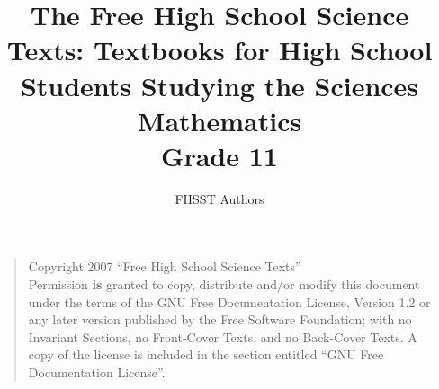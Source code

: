 \documentclass[10pt,a4paper,titlepage,twoside,openright]{report}
\begin{document}
\title{The Free High School Science Texts: Textbooks for High School Students Studying the Sciences\\
\textbf{Mathematics}\\
Grade 11}
\author{FHSST Authors}
\maketitle
\cleardoublepage
\begin{quote}
Copyright 2007 ``Free High School Science Texts''\\
Permission \textbf{is} granted to copy, distribute and/or modify this document under the terms of the GNU Free Documentation License, Version 1.2 or any later version published by the Free Software Foundation; with no Invariant Sections, no Front-Cover Texts, and no Back-Cover Texts.
A copy of the license is included in the section entitled ``GNU Free Documentation License''.
\end{quote}
\end{document}
